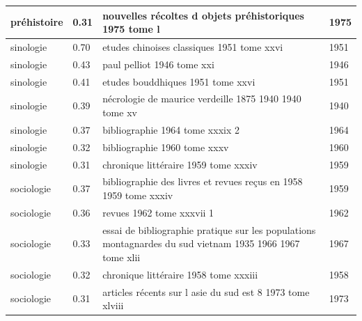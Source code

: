 \begin{longtable}{|p{3cm}|p{1cm}|p{10cm}|p{1cm}|}
préhistoire & 0.31 & nouvelles récoltes d objets préhistoriques 1975 tome l & 1975  \\ \hline
sinologie & 0.70 & etudes chinoises classiques 1951 tome xxvi & 1951  \\ \hline
sinologie & 0.43 & paul pelliot 1946 tome xxi & 1946  \\ \hline
sinologie & 0.41 & etudes bouddhiques 1951 tome xxvi & 1951  \\ \hline
sinologie & 0.39 & nécrologie de maurice verdeille 1875 1940 1940 tome xv & 1940  \\ \hline
sinologie & 0.37 & bibliographie 1964 tome xxxix 2 & 1964  \\ \hline
sinologie & 0.32 & bibliographie 1960 tome xxxv & 1960  \\ \hline
sinologie & 0.31 & chronique littéraire 1959 tome xxxiv & 1959  \\ \hline
sociologie & 0.37 & bibliographie des livres et revues reçus en 1958 1959 tome xxxiv & 1959  \\ \hline
sociologie & 0.36 & revues 1962 tome xxxvii 1 & 1962  \\ \hline
sociologie & 0.33 & essai de bibliographie pratique sur les populations montagnardes du sud vietnam 1935 1966 1967 tome xlii & 1967  \\ \hline
sociologie & 0.32 & chronique littéraire 1958 tome xxxiii & 1958  \\ \hline
sociologie & 0.31 & articles récents sur l asie du sud est 8 1973 tome xlviii & 1973 \\ \hline 
\end{longtable}
\label{tab:full_discipline}